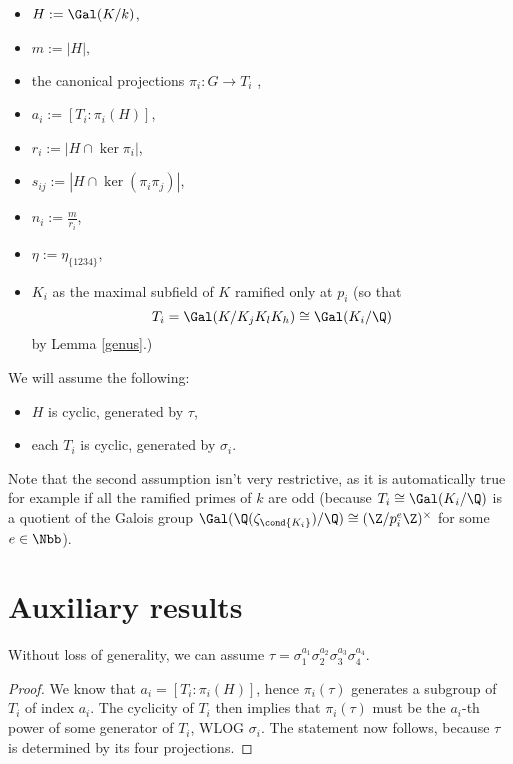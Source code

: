 \begin{itemize}
\item $H:=\Gal(K/k)$, 
\item $m:=|H|,$
\item the canonical projections $\pi_i:G\to T_i$ ,
\item $a_i:=[T_i:\pi_i(H)]$,
\item $r_i:=|H\cap \ker \pi_i|$,
\item $s_{ij}:=|H\cap \ker (\pi_i\pi_j)|$,
\item $n_i:=\frac{m}{r_i}$,
\item $\eta:=\eta_{\{1234\}}$,
\item $K_i$ as the maximal subfield of $K$ ramified only at $p_i$ (so that $$T_i=\Gal(K/K_jK_lK_h)\cong \Gal(K_i/\Q)$$ by Lemma \ref{genus}.)
\end{itemize}

We will assume the following: \label{assum}
\begin{itemize}
\item $H$ is cyclic, generated by $\tau$,
\item each $T_i$ is cyclic, generated by $\sigma_i$.
\end{itemize}
Note that the second assumption isn't very restrictive, as it is automatically true for example if all the ramified primes of $k$ are odd (because $T_i\cong \Gal(K_i/\Q)$ is a quotient of the Galois group $\Gal(\Q(\zeta_{\cond{K_i}})/\Q)\cong (\Z/p_i^e\Z)^{\times}$ for some $e\in\Nbb$).

\section{Auxiliary results}
\begin{lemma}\label{tau}
Without loss of generality, we can assume $\tau=\sigma_1^{a_1}\sigma_2^{a_2}\sigma_3^{a_3}\sigma_4^{a_4}$.
\end{lemma}
\begin{proof}
We know that $a_i=[T_i:\pi_i(H)]$, hence
$\pi_i(\tau)$ generates a subgroup of $T_i$ of index $a_i$. The cyclicity of $T_i$ then implies that $\pi_i(\tau)$ must be the $a_i$-th power of some generator of $T_i$, WLOG $\sigma_i$. The statement now follows, because $\tau$ is determined by its four projections.
\end{proof}


